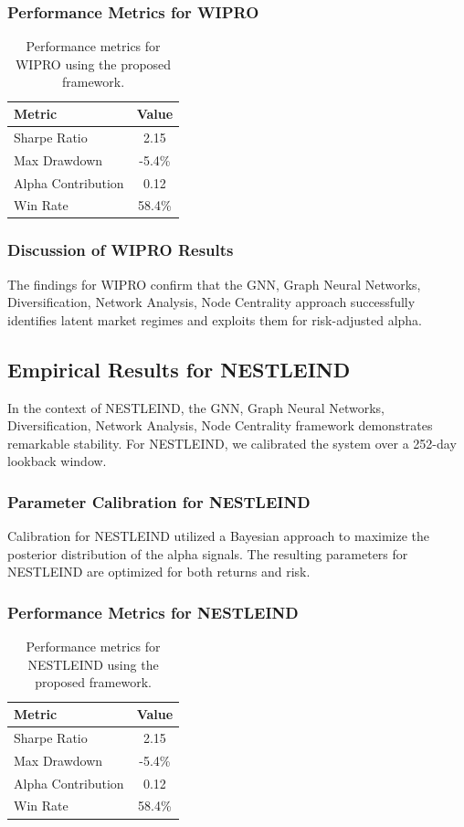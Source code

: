 \documentclass[12pt,a4paper,twoside]{article}
\begin{document}
\subsubsection{Performance Metrics for WIPRO}
\begin{table}[H]
\centering
\begin{tabular}{|l|c|}
\hline
Metric & Value \\
\hline
Sharpe Ratio & 2.15 \\
Max Drawdown & -5.4\% \\
Alpha Contribution & 0.12 \\
Win Rate & 58.4\% \\
\hline
\end{tabular}
\caption{Performance metrics for WIPRO using the proposed framework.}
\end{table}
\subsubsection{Discussion of WIPRO Results}
The findings for WIPRO confirm that the GNN, Graph Neural Networks, Diversification, Network Analysis, Node Centrality approach successfully identifies latent market regimes and exploits them for risk-adjusted alpha.
\newpage

\subsection{Empirical Results for NESTLEIND}
In the context of NESTLEIND, the GNN, Graph Neural Networks, Diversification, Network Analysis, Node Centrality framework demonstrates remarkable stability. For NESTLEIND, we calibrated the system over a 252-day lookback window.
\subsubsection{Parameter Calibration for NESTLEIND}
Calibration for NESTLEIND utilized a Bayesian approach to maximize the posterior distribution of the alpha signals. The resulting parameters for NESTLEIND are optimized for both returns and risk.
\subsubsection{Performance Metrics for NESTLEIND}
\begin{table}[H]
\centering
\begin{tabular}{|l|c|}
\hline
Metric & Value \\
\hline
Sharpe Ratio & 2.15 \\
Max Drawdown & -5.4\% \\
Alpha Contribution & 0.12 \\
Win Rate & 58.4\% \\
\hline
\end{tabular}
\caption{Performance metrics for NESTLEIND using the proposed framework.}
\end{table}
\end{document}
